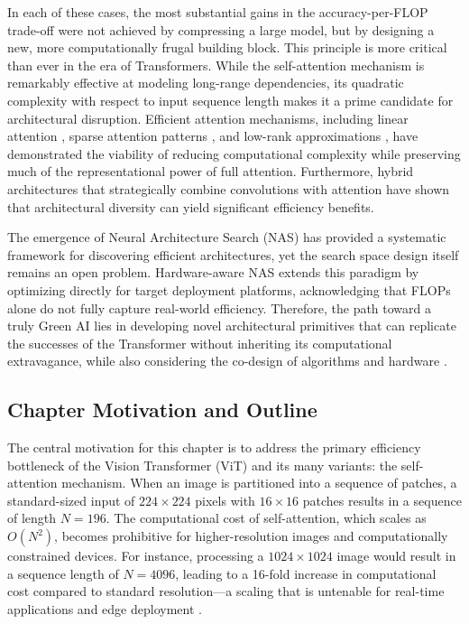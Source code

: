 \documentclass[12pt, a4paper]{article}
\begin{document}
In each of these cases, the most substantial gains in the accuracy-per-FLOP trade-off were not achieved by compressing a large model, but by designing a new, more computationally frugal building block. This principle is more critical than ever in the era of Transformers. While the self-attention mechanism is remarkably effective at modeling long-range dependencies, its quadratic complexity with respect to input sequence length makes it a prime candidate for architectural disruption. Efficient attention mechanisms, including linear attention \cite{katharopoulos2020transformers}, sparse attention patterns \cite{child2019generating}, and low-rank approximations \cite{wang2020linformer}, have demonstrated the viability of reducing computational complexity while preserving much of the representational power of full attention. Furthermore, hybrid architectures that strategically combine convolutions with attention \cite{dai2021coatnet, wang2021pyramid} have shown that architectural diversity can yield significant efficiency benefits.

The emergence of Neural Architecture Search (NAS) \cite{zoph2018learning, elsken2019neural} has provided a systematic framework for discovering efficient architectures, yet the search space design itself remains an open problem. Hardware-aware NAS \cite{cai2019proxylessnas, tan2021efficientnetv2} extends this paradigm by optimizing directly for target deployment platforms, acknowledging that FLOPs alone do not fully capture real-world efficiency. Therefore, the path toward a truly Green AI lies in developing novel architectural primitives that can replicate the successes of the Transformer without inheriting its computational extravagance, while also considering the co-design of algorithms and hardware \cite{chen2019tvm}.

\subsection{Chapter Motivation and Outline}
\label{ssec:motivation_and_outline}

The central motivation for this chapter is to address the primary efficiency bottleneck of the Vision Transformer (ViT) \cite{dosovitskiy2020image} and its many variants: the self-attention mechanism. When an image is partitioned into a sequence of patches, a standard-sized input of $224 \times 224$ pixels with $16 \times 16$ patches results in a sequence of length $N=196$. The computational cost of self-attention, which scales as $O(N^2)$, becomes prohibitive for higher-resolution images and computationally constrained devices. For instance, processing a $1024 \times 1024$ image would result in a sequence length of $N=4096$, leading to a 16-fold increase in computational cost compared to standard resolution—a scaling that is untenable for real-time applications and edge deployment \cite{liu2021swin}.
\end{document}

